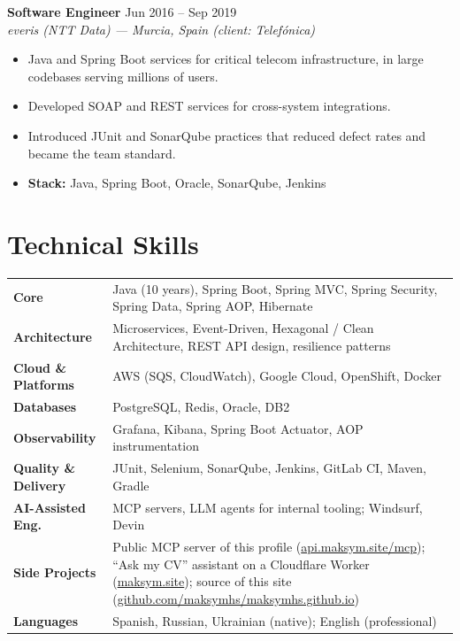 \documentclass[a4paper,9pt]{extarticle}
\newcommand{\entrada}[4]{%
  \Needspace{5\baselineskip}%
  \noindent
  \textbf{#1} \hfill {\small\color{gris}#3}\\[0.05em]
  {\color{gris}\textit{#2}}%
  \begin{itemize}[
    leftmargin=1.1em,
    topsep=0.1em,
    itemsep=0.03em,
    parsep=0em,
    partopsep=0em
  ]
    #4
  \end{itemize}
  \vspace{0.1em}
}
\newcommand{\stack}[1]{\item[] {\footnotesize\color{gris}\textbf{Stack:} #1}}
\begin{document}
\entrada
  {Software Engineer}
  {everis (NTT Data) --- Murcia, Spain (client: Telef\'onica)}
  {Jun 2016 -- Sep 2019}
  {
    \item Java and Spring Boot services for critical telecom infrastructure, in large codebases serving millions of users.
    \item Developed SOAP and REST services for cross-system integrations.
    \item Introduced JUnit and SonarQube practices that reduced defect rates and became the team standard.
    \stack{Java, Spring Boot, Oracle, SonarQube, Jenkins}
  }

\section{Technical Skills}

{\footnotesize
\begin{tabularx}{\textwidth}{@{} >{\bfseries\color{accent}}l >{\raggedright\arraybackslash}X @{}}
  Core                & Java (10 years), Spring Boot, Spring MVC, Spring Security, Spring Data, Spring AOP, Hibernate \\[0.1em]
  Architecture        & Microservices, Event-Driven, Hexagonal / Clean Architecture, REST API design, resilience patterns \\[0.1em]
  Cloud \& Platforms  & AWS (SQS, CloudWatch), Google Cloud, OpenShift, Docker \\[0.1em]
  Databases           & PostgreSQL, Redis, Oracle, DB2 \\[0.1em]
  Observability       & Grafana, Kibana, Spring Boot Actuator, AOP instrumentation \\[0.1em]
  Quality \& Delivery & JUnit, Selenium, SonarQube, Jenkins, GitLab CI, Maven, Gradle \\[0.1em]
  AI-Assisted Eng.    & MCP servers, LLM agents for internal tooling; Windsurf, Devin \\[0.1em]
  Side Projects       & Public MCP server of this profile (\href{https://api.maksym.site/mcp}{api.maksym.site/mcp}); ``Ask my CV'' assistant on a Cloudflare Worker (\href{https://maksym.site}{maksym.site}); source of this site (\href{https://github.com/maksymhs/maksymhs.github.io}{github.com/maksymhs/maksymhs.github.io}) \\[0.1em]
  Languages           & Spanish, Russian, Ukrainian (native); English (professional)
\end{tabularx}
}
\end{document}
